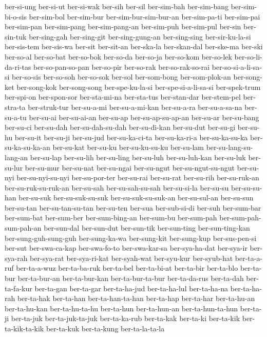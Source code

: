 {ber-si-ung ber-si-ut ber-si-wak ber-sih ber-sil ber-sim-bah ber-sim-bang
ber-sim-bi-o-sis ber-sim-bol ber-sim-bur ber-sim-bur-sim-bur-an
ber-sim-pa-ti ber-sim-pai ber-sim-pan ber-sim-pang ber-sim-pang-an
ber-sim-puh ber-sim-pul ber-sin ber-sin-tuk ber-sing-gah ber-sing-git
ber-sing-gung-an ber-sing-sing ber-sir-ku-la-si ber-sis-tem ber-sis-wa
ber-sit ber-sit-an ber-ska-la ber-skan-dal ber-ske-ma ber-ski ber-so-al
ber-so-bat ber-so-bok ber-so-da ber-so-ja ber-so-kom ber-so-lek
ber-so-li-da-ri-tas ber-so-pan-so-pan ber-so-pir ber-so-rak
ber-so-rak-so-rai ber-so-si-a-li-sa-si ber-so-sis ber-so-soh ber-so-sok
ber-sol ber-som-bong ber-som-plok-an ber-song-ket ber-song-kok
ber-song-song ber-spe-ku-la-si ber-spe-si-a-li-sa-si ber-spek-trum
ber-spi-on ber-spon-sor ber-sta-mi-na ber-sta-tus ber-stan-dar
ber-stem-pel ber-stra-ta ber-struk-tur ber-su-a-mi ber-su-a-mi-kan
ber-su-a-ra ber-su-a-sa-na ber-su-a-tu ber-su-ai ber-su-ai-an ber-su-ap
ber-su-ap-su-ap-an ber-su-ar ber-su-bang ber-su-ci ber-su-dah
ber-su-dah-su-dah ber-su-di-kan ber-su-dut ber-su-gi ber-su-hu ber-su-it
ber-su-ji ber-su-jud ber-su-ka-ci-ta ber-su-ka-ri-a ber-su-ka-su-ka
ber-su-ka-su-ka-an ber-su-kat ber-su-ku ber-su-ku-su-ku ber-su-lam
ber-su-lang-su-lang-an ber-su-lap ber-su-lih ber-su-ling ber-su-luh
ber-su-luh-kan ber-su-luk ber-su-lur ber-su-mur ber-su-nat ber-su-ngai
ber-su-ngut ber-su-ngut-su-ngut ber-su-nyi ber-su-nyi-su-nyi
ber-su-por-ter ber-su-rai ber-su-rat ber-su-rih ber-su-ruk-an
ber-su-ruk-su-ruk-an ber-su-sah ber-su-sah-su-sah ber-su-si-la ber-su-su
ber-su-su-han ber-su-suk ber-su-suk-su-suk ber-su-suk-su-suk-an
ber-su-sul-an ber-su-sun ber-su-tan ber-su-tan-su-tan ber-su-ten ber-sua
ber-sub-si-di ber-suh ber-sum-bar ber-sum-bat ber-sum-ber ber-sum-bing-an
ber-sum-bu ber-sum-pah ber-sum-pah-sum-pah-an ber-sun-dal ber-sun-dut
ber-sun-tik ber-sun-ting ber-sun-ting-kan ber-sung-guh-sung-guh
ber-sung-ka-wa ber-sung-kit ber-sung-kup ber-sus-pen-si ber-sut
ber-swa-ca-kap ber-swa-fo-to ber-swa-kar-sa ber-sya-ha-dat ber-sya-ir
ber-sya-rah ber-sya-rat ber-sya-ri-kat ber-syah-wat ber-syu-kur
ber-syub-hat ber-ta-a-ruf ber-ta-a-wuz ber-ta-ba-ruk ber-ta-bel
ber-ta-bi-at ber-ta-bir ber-ta-blo ber-ta-bur ber-ta-bur-an ber-ta-bur-kan
ber-ta-bur-ta-bur ber-ta-da-rus ber-ta-dah ber-ta-fa-kur ber-ta-gan
ber-ta-gar ber-ta-ha-jud ber-ta-ha-lul ber-ta-ha-na ber-ta-ha-rah
ber-ta-hak ber-ta-han ber-ta-han-ta-han ber-ta-hap ber-ta-har ber-ta-hu-an
ber-ta-hu-kan ber-ta-hu-ta-hu ber-ta-hun ber-ta-hun-an ber-ta-hun-ta-hun
ber-ta-ji ber-ta-juk ber-ta-juk-ta-juk ber-ta-ka-rub ber-ta-kak ber-ta-ki
ber-ta-kik ber-ta-kik-ta-kik ber-ta-kuk ber-ta-kung ber-ta-la-ta-la
}
